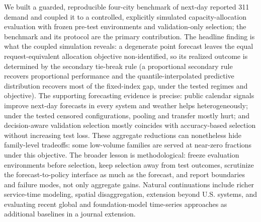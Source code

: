 We built a guarded, reproducible four-city benchmark of next-day reported
311 demand and coupled it to a controlled, explicitly simulated
capacity-allocation evaluation with frozen pre-test environments and
validation-only selection; the benchmark and its protocol are the primary
contribution. The headline finding is what the coupled simulation
reveals: a degenerate point forecast leaves the equal request-equivalent
allocation objective non-identified, so its realized outcome is
determined by the secondary tie-break rule (a proportional secondary
rule recovers proportional performance and the quantile-interpolated
predictive distribution recovers most of the fixed-index gap, under the
tested regimes and objective). The supporting forecasting evidence is
precise: public calendar signals improve next-day forecasts in every
system and weather helps heterogeneously; under the tested censored
configurations, pooling and transfer mostly hurt; and decision-aware
validation selection mostly coincides with accuracy-based selection
without increasing test loss. These aggregate reductions can nonetheless
hide family-level tradeoffs: some low-volume families are served at
near-zero fractions under this objective. The broader lesson is
methodological: freeze evaluation environments before selection, keep
selection away from test outcomes, scrutinize the forecast-to-policy
interface as much as the forecast, and report boundaries and failure
modes, not only aggregate gains.
Natural continuations include richer service-time modeling, spatial
disaggregation, extension beyond U.S. systems, and evaluating recent
global and foundation-model time-series approaches as additional
baselines in a journal extension.

